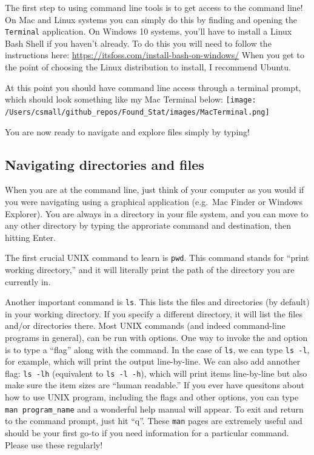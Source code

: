 \documentclass[]{book}
\begin{document}
The first step to using command line tools is to get access to the command line! On Mac and Linux systems you can simply do this by finding and opening the \texttt{Terminal} application. On Windows 10 systems, you'll have to install a Linux Bash Shell if you haven't already. To do this you will need to follow the instructions here: \url{https://itsfoss.com/install-bash-on-windows/}
When you get to the point of choosing the Linux distribution to install, I recommend Ubuntu.

At this point you should have command line access through a terminal prompt, which should look something like my Mac Terminal below:
\texttt{[image: /Users/csmall/github\_repos/Found\_Stat/images/MacTerminal.png]}

You are now ready to navigate and explore files simply by typing!

\hypertarget{navigating-directories-and-files}{%
\subsection{Navigating directories and files}\label{navigating-directories-and-files}}

When you are at the command line, just think of your computer as you would if you were navigating using a graphical application (e.g.~Mac Finder or Windows Explorer). You are always in a directory in your file system, and you can move to any other directory by typing the approriate command and destination, then hitting Enter.

The first crucial UNIX command to learn is \texttt{pwd}. This command stands for ``print working directory,'' and it will literally print the path of the directory you are currently in.

Another important command is \texttt{ls}. This lists the files and directories (by default) in your working directory. If you specify a different directory, it will list the files and/or directories there. Most UNIX commands (and indeed command-line programs in general), can be run with options. One way to invoke the and option is to type a ``flag'' along with the command. In the case of \texttt{ls}, we can type \texttt{ls\ -l}, for example, which will print the output line-by-line. We can also add annother flag: \texttt{ls\ -lh} (equivalent to \texttt{ls\ -l\ -h}), which will print items line-by-line but also make sure the item sizes are ``human readable.'' If you ever have quesitons about how to use UNIX program, including the flags and other options, you can type \texttt{man\ program\_name} and a wonderful help manual will appear. To exit and return to the command prompt, just hit ``q''. These \texttt{man} pages are extremely useful and should be your first go-to if you need information for a particular command. Please use these regularly!
\end{document}
